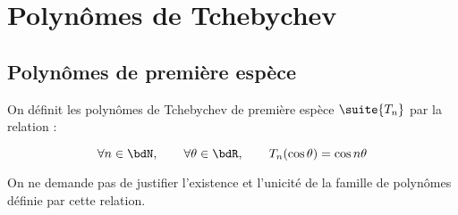 \documentclass[a4paper,french,bookmarks]{article}
\begin{document}

\section{Polynômes de Tchebychev}

\subsection{Polynômes de première espèce}

On définit les polynômes de Tchebychev de première espèce $\suite{T_n}$ par la relation :

\begin{equation}
     \forall n \in \bdN, \qquad \forall \theta \in \bdR,\qquad T_n(\cos \theta) = \cos{n\theta}
\end{equation}

On ne demande pas de justifier l'existence et l'unicité de la famille de polynômes définie par cette relation.
\end{document}
